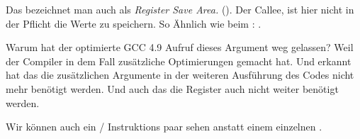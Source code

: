 Das bezeichnet man auch als \emph{Register Save Area.} (\ARMPCS).
Der Callee, ist hier nicht in der Pflicht die Werte zu speichern.
So Ähnlich wie beim : .


Warum hat der optimierte GCC 4.9 Aufruf dieses Argument weg gelassen?
Weil der Compiler in dem Fall zusätzliche Optimierungen gemacht hat. Und
erkannt hat das die zusätzlichen Argumente in der weiteren Ausführung des 
Codes nicht mehr benötigt werden. Und auch das die Register  auch 
nicht weiter benötigt werden.


Wir können auch ein / Instruktions paar sehen anstatt einem einzelnen
.

